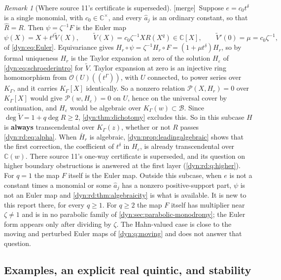 \documentclass[11pt,letterpaper]{article}
\theoremstyle{definition}
\theoremstyle{remark}
\newtheorem{remark}[remark]{Remark}
\newcommand{\C}{\mathbb C}
\newcommand{\OO}{\mathcal O}
\newcommand{\BB}{\mathscr B}
\newcommand{\eps}{\varepsilon}
\newcommand{\mergetag}{\textup{\textsf{\small[merge]}}}%
\numberwithin{equation}{section}
\begin{document}
\begin{remark}[Where source 11's certificate is superseded]
\label{dyn:rd:rem:superseded}
\mergetag\ Suppose $e=c_0t^{\delta}$ is a single monomial, with
$c_0\in\C^{\times}$, and every $\hat a_j$ is an ordinary constant, so that
$\widehat R=R$. Then $\psi=\zeta^{-1}F$ is the Euler map
\[
 \psi(X)=X+t^{\delta}\widetilde V(X),\qquad
 \widetilde V(X)=c_0\zeta^{-1}XR(X^{q})\in\C[X],\qquad
 \widetilde V'(0)=\mu=c_0\zeta^{-1},
\]
of \eqref{dyn:eq:Euler}. Equivariance gives
$H_r\circ\psi=\zeta^{-1}H_r\circ F=(1+\mu t^{\delta})H_r$, so by formal
uniqueness $H_r$ is the Taylor expansion at zero of the solution $H_\eps$
of \eqref{dyn:eq:schroederintro} for $\widetilde V$. Taylor expansion at
zero is an injective ring homomorphism from $\OO(U)((t^{\Gamma}))$, with
$U$ connected, to power series over $K_\Gamma$, and it carries $K_\Gamma[X]$
identically. So a nonzero relation $\mathcal P(X,H_r)=0$ over
$K_\Gamma[X]$ would give $\mathcal P(w,H_\eps)=0$ on $U$, hence on the
universal cover by continuation, and $H_\eps$ would be algebraic over
$K_\Gamma(w)\subset\BB$. Since $\deg\widetilde V=1+q\deg R\ge2$,
\cref{dyn:thm:dichotomy} excludes this. So in this subcase $H$ is
\textbf{always} transcendental over $K_\Gamma(z)$, whether or not $R$ passes
\eqref{dyn:rd:eq:alpha}. When $\bar H_r$ is algebraic,
\cref{dyn:prop:leadingalgebraic} shows that the first correction, the
coefficient of $t^{\delta}$ in $H_\eps$, is already transcendental over
$\C(w)$. There source 11's one-way certificate is superseded, and its
question on higher boundary obstructions is answered at the first layer
(\cref{dyn:rd:q:higher}). For $q=1$ the map $F$ itself is the Euler map.
Outside this subcase, when $e$ is not a constant times a monomial or some
$\hat a_j$ has a nonzero positive-support part, $\psi$ is not an Euler map
and \cref{dyn:rd:thm:algebraicity} is what is available. It is new to this
report there, for every $q\ge1$. For $q\ge2$ the map $F$ itself has
multiplier near $\zeta\ne1$ and is in no parabolic family of
\cref{dyn:sec:parabolic-monodromy}; the Euler form appears only after
dividing by $\zeta$. The Hahn-valued case is close to the moving and
perturbed Euler maps of \cref{dyn:q:moving} and does not answer that
question.
\end{remark}

\subsection{Examples, an explicit real quintic, and stability}
\label{dyn:rd:subsec:examples}
\end{document}

